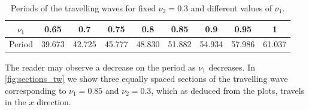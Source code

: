\documentclass[twoside]{article}
\begin{document}
\begin{table}[ht]
  \centering
  \begin{tabular}{|c||cccccccc|}
    \hline
    $\nu_1$ & 0.65   & 0.7    & 0.75   & 0.8    & 0.85   & 0.9    & 0.95   & 1      \\ \hline
    Period  & 39.673 & 42.725 & 45.777 & 48.830 & 51.882 & 54.934 & 57.986 & 61.037 \\
    \hline
  \end{tabular}
  \caption{Periods of the travelling waves for fixed $\nu_2=0.3$ and different values of $\nu_1$.}
  \label{tab:travelling_waves}
\end{table}

The reader may observe a decrease on the period as $\nu_1$ decreases. In \cref{fig:sections_tw} we show three equally spaced sections of the travelling wave corresponding to $\nu_1=0.85$ and $\nu_2=0.3$, which as deduced from the plots, travels in the $x$ direction.
\end{document}
